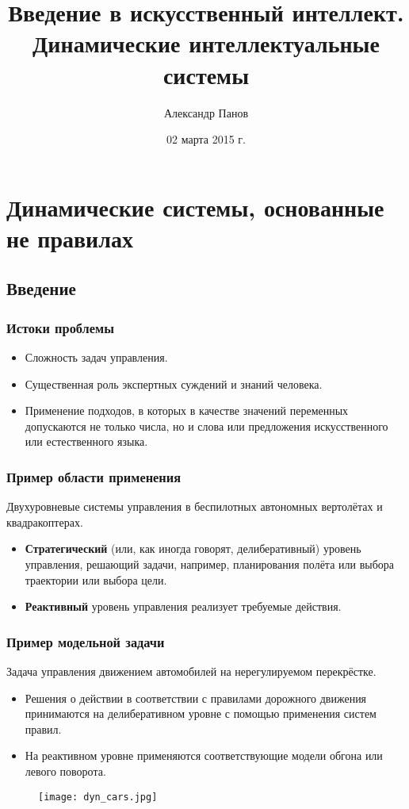 \documentclass[default]{beamer}
\begin{document}
	
	\title[Введение в ИИ. ДИС]{Введение в искусственный интеллект.\\Динамические интеллектуальные системы}
	\author[Панов]{Александр Панов}
	\date{02 марта 2015 г.} 
	
	\begin{frame}
		\titlepage
	\end{frame}
	
	\section {Динамические системы, основанные не правилах}
	\subsection{Введение}
	\begin{frame}
		\frametitle{Истоки проблемы}
		\begin{itemize}
			\item Сложность задач управления.
			\item Существенная роль экспертных суждений и знаний человека.
			\item Применение подходов, в которых в качестве значений переменных допускаются не только числа, но и слова или предложения искусственного или естественного языка.
		\end{itemize}
	\end{frame}

	\begin{frame}
		\frametitle{Пример области применения}
		
		Двухуровневые системы управления в беспилотных автономных вертолётах и квадракоптерах.
		\begin{itemize}
			\item \textbf{Стратегический} (или, как иногда говорят, делиберативный) уровень управления, решающий задачи, например, планирования полёта или выбора траектории или выбора цели.
			\item \textbf{Реактивный} уровень управления реализует требуемые действия. 
		\end{itemize}
	\end{frame}

	\begin{frame}
		\frametitle{Пример модельной задачи}
		
		Задача управления движением автомобилей на нерегулируемом перекрёстке.
		\begin{itemize}
			\item Решения о действии в соответствии с правилами дорожного движения принимаются на делиберативном уровне с помощью применения систем правил.
			\item На реактивном уровне применяются соответствующие модели обгона или левого поворота.
		\end{itemize}
		\par\bigskip
		\begin{figure}
			\centering
			\texttt{[image: dyn\_cars.jpg]}
		\end{figure}
	\end{frame}
					
\end{document}
